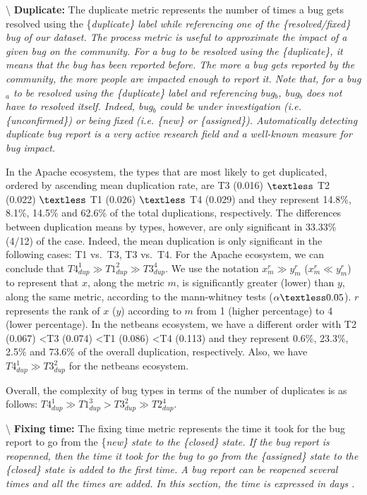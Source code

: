 \textbackslash{} \vspace{0.1cm} {\bf Duplicate: } The duplicate metric
represents the number of times a bug gets resolved using the
\{\it duplicate\} label while referencing one of the
\{\it resolved/fixed\} bug of our dataset. The process metric is useful
to approximate the impact of a given bug on the community. For a bug to
be resolved using the \{\it duplicate\}, it means that the bug has been
reported before. The more a bug gets reported by the community, the more
people are impacted enough to report it. Note that, for a bug\(_a\) to
be resolved using the \{\it duplicate\} label and referencing bug\(_b\),
bug\(_b\) does not have to resolved itself. Indeed, bug\(_b\) could be
under investigation (i.e. \{\it unconfirmed\}) or being fixed (i.e.
\{\it new\} or \{\it assigned\}). Automatically detecting duplicate bug
report is a very active research field
\cite{Sun2011,Bettenburg2008a,Nguyen2012,Jalbert2008,Tian2012a,Runeson2007}
and a well-known measure for bug impact.

In the Apache ecosystem, the types that are most likely to get
duplicated, ordered by ascending mean duplication rate, are T3 (0.016)
\(\textless\) T2 (0.022) \(\textless\) T1 (0.026) \(\textless\) T4
(0.029) and they represent 14.8\%, 8.1\%, 14.5\% and 62.6\% of the total
duplications, respectively. The differences between duplication means by
types, however, are only significant in 33.33\% (4/12) of the case.
Indeed, the mean duplication is only significant in the following cases:
T1 vs.~T3, T3 vs.~T4. For the Apache ecosystem, we can conclude that
\(T4_{dup}^1 \gg T1_{dup}^2 \gg T3_{dup}^4\). We use the notation
\(x_{m}^r \gg y_{m}^r\) (\(x_{m}^r \ll y_{m}^r\)) to represent that
\(x\), along the metric \(m\), is significantly greater (lower) than
\(y\), along the same metric, according to the mann-whitney tests
(\(\alpha \textless 0.05\)). \(r\) represents the rank of \(x\) (\(y\))
according to \(m\) from 1 (higher percentage) to 4 (lower percentage).
In the netbeans ecosystem, we have a different order with T2 (0.067)
\textless T3 (0.074) \textless T1 (0.086) \textless T4 (0.113) and they
represent 0.6\%, 23.3\%, 2.5\% and 73.6\% of the overall duplication,
respectively. Also, we have \(T4_{dup}^1 \gg T3_{dup}^2\) for the
netbeans ecosystem.

Overall, the complexity of bug types in terms of the number of
duplicates is as follows:
\(T4_{dup}^{1} \gg T1_{dup}^{3} > T3_{dup}^{2} \gg T2_{dup}^{4}\).

\textbackslash{} \vspace{0.1cm} {\bf Fixing time: } The fixing time
metric represents the time it took for the bug report to go from the
\{\it new\} state to the \{\it closed\} state. If the bug report is
reopenned, then the time it took for the bug to go from the
\{\it assigned\} state to the \{\it closed\} state is added to the first
time. A bug report can be reopened several times and all the times are
added. In this section, the time is expressed in days
\cite{Weiss2007,Zhang2012,Zhang2013}.

